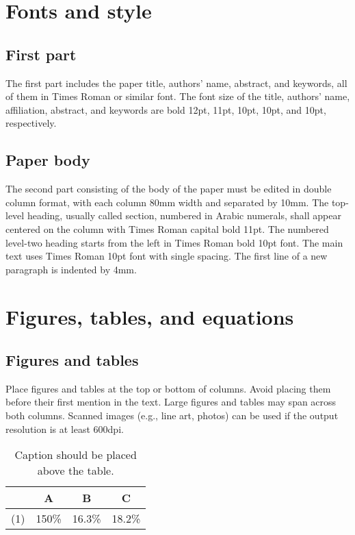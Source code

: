 \documentclass[fleqn,10pt,twocolumn]{SWARM17}
\begin{document}
\section{Fonts and style}

\subsection{First part}

The first part includes the paper title, authors' name, abstract, and
keywords, all of them in Times Roman or similar font.  The font
size of the title, authors' name, affiliation, abstract, and keywords
are bold 12pt, 11pt, 10pt, 10pt, and 10pt, respectively.

\subsection{Paper body}

The second part consisting of the body of the paper must be edited in
double column format, with each column 80mm width and separated by
10mm.  The top-level heading, usually called section, numbered in
Arabic numerals, shall appear centered on the column with Times Roman
capital bold 11pt.  The numbered level-two heading starts from the
left in Times Roman bold 10pt font.  The main text uses Times Roman
10pt font with single spacing.  The first line of a new paragraph is
indented by 4mm.

\section{Figures, tables, and equations}

\subsection{Figures and tables}

Place figures and tables at the top or bottom of columns.
Avoid placing them before their first mention in the text.
Large figures and tables may span across both columns.
Scanned images (e.g., line art, photos) can be used if the output
resolution is at least 600dpi.

\begin{table}[b]
\caption{Caption should be placed above the table.}
\begin{center}
\begin{tabular}{|c|c|c|c|}\hline
    &   A   &   B   &   C \\\hline
(1) & 150\% & 16.3\% & 18.2\% \\\hline
\end{tabular}
\end{center}
\end{table}
\end{document}
